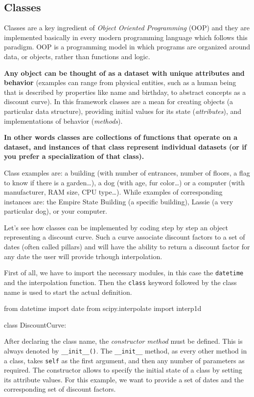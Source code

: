 \documentclass[12pt,a4paper]{book}
\begin{document}
\subsection{Classes}

Classes are a key ingredient of \emph{Object Oriented Programming} (OOP) and they are implemented basically in every modern programming language which follows this paradigm.
OOP is a programming model in which programs are organized around data, or objects, rather than functions and logic.

\textbf{Any object can be thought of as a dataset with unique attributes and behavior} (examples can range from physical entities, such as a human being that is described by properties like name and birthday, to abstract concepts as a discount curve). 
In this framework classes are a mean for creating objects (a particular data structure), providing initial values for its state (\emph{attributes}), and implementations of behavior (\emph{methods}).

\textbf{In other words classes are collections of functions that operate on a dataset, and instances of that class represent individual datasets (or if you prefer a specialization of that class).}

Class examples are: a building (with number of entrances, number of floors, a flag to know if there is a garden\ldots), a dog (with age, fur color\ldots) or a computer (with manufacturer, RAM size, CPU type\ldots).
While examples of corresponding instances are: the Empire State Building (a specific building), Lassie (a very particular dog), or your computer.

Let's see how classes can be implemented by coding step by step an object representing a discount curve. Such a curve associate discount factors to a set of dates (often called pillars) and will have the ability to return a discount factor for any date the user will provide trhough interpolation.

First of all, we have to import the necessary modules, in this case the \texttt{datetime} and the interpolation function.
Then the \texttt{class} keyword followed by the class name is used to start the actual definition.

\begin{ipython}
from datetime import date
from scipy.interpolate import interp1d

class DiscountCurve:
\end{ipython}

After declaring the class name, the \emph{constructor method} must be defined. This is always denoted by \texttt{\_\_init\_\_()}. The \texttt{\_\_init\_\_} method, as every other method in a class, takes \texttt{self} as the first argument, and then any number of parameters as required. The constructor allows to specify the initial state of a class by setting its attribute values. For this example, we want to provide a set of dates and the corresponding set of discount factors.
\end{document}
